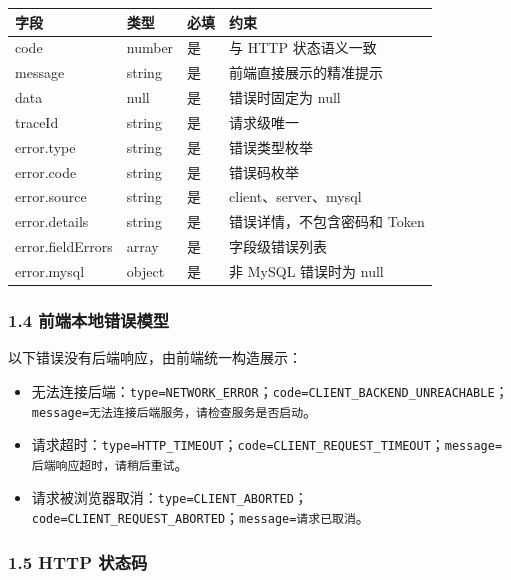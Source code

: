 \documentclass[
  a4paper,
  UTF8]{ctexart}
\providecommand{\tightlist}{%
  \setlength{\itemsep}{0pt}\setlength{\parskip}{0pt}}
\begin{document}
\begin{longtable}[]{@{}llll@{}}
\toprule
字段 & 类型 & 必填 & 约束 \\
\midrule
\endhead
code & number & 是 & 与 HTTP 状态语义一致 \\
message & string & 是 & 前端直接展示的精准提示 \\
data & null & 是 & 错误时固定为 null \\
traceId & string & 是 & 请求级唯一 \\
error.type & string & 是 & 错误类型枚举 \\
error.code & string & 是 & 错误码枚举 \\
error.source & string & 是 & client、server、mysql \\
error.details & string & 是 & 错误详情，不包含密码和 Token \\
error.fieldErrors & array & 是 & 字段级错误列表 \\
error.mysql & object & 是 & 非 MySQL 错误时为 null \\
\bottomrule
\end{longtable}

\hypertarget{ux524dux7aefux672cux5730ux9519ux8befux6a21ux578b}{%
\subsubsection{1.4
前端本地错误模型}\label{ux524dux7aefux672cux5730ux9519ux8befux6a21ux578b}}

以下错误没有后端响应，由前端统一构造展示：

\begin{itemize}
\tightlist
\item
  无法连接后端：\texttt{type=NETWORK\_ERROR}；\texttt{code=CLIENT\_BACKEND\_UNREACHABLE}；\texttt{message=无法连接后端服务，请检查服务是否启动}。
\item
  请求超时：\texttt{type=HTTP\_TIMEOUT}；\texttt{code=CLIENT\_REQUEST\_TIMEOUT}；\texttt{message=后端响应超时，请稍后重试}。
\item
  请求被浏览器取消：\texttt{type=CLIENT\_ABORTED}；\texttt{code=CLIENT\_REQUEST\_ABORTED}；\texttt{message=请求已取消}。
\end{itemize}

\hypertarget{http-ux72b6ux6001ux7801}{%
\subsubsection{1.5 HTTP 状态码}\label{http-ux72b6ux6001ux7801}}
\end{document}
